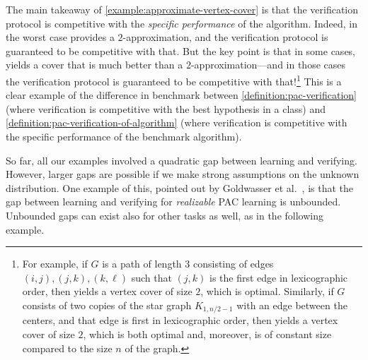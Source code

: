 \documentclass[11pt]{article}
\numberwithin{equation}{section}
\theoremstyle{definition}
\theoremstyle{plain}
\theoremstyle{definition}\newtheorem{notation}[theorem]{Notation}\theoremstyle{plain}\raggedbottom
\newcommand{\1}{\mathds{1}}
\begin{document}
The main takeaway of \cref{example:approximate-vertex-cover} is that the verification protocol is competitive with the \emph{specific performance} of the algorithm. Indeed, in the worst case  provides a {$2$-approximation}, and the verification protocol is guaranteed to be competitive with that. But the key point is that in some cases,  yields a cover that is much better than a {$2$-approximation}---and in those cases the verification protocol is guaranteed to be competitive with that!\footnote{%
	For example, if $G$ is a path of length $3$ consisting of edges $(i,j), (j,k), (k,\ell)$ such that $(j,k)$ is the first edge in lexicographic order, then  yields a vertex cover of size $2$, which is optimal. Similarly, if $G$ consists of two copies of the star graph $K_{1,n/2-1}$ with an edge between the centers, and that edge is first in lexicographic order, then  yields a vertex cover of size $2$, which is both optimal and, moreover, is of constant size compared to the size $n$ of the graph.%
} This is a clear example of the difference in benchmark between \cref{definition:pac-verification} (where verification is competitive with the best hypothesis in a class) and \cref{definition:pac-verification-of-algorithm} (where verification is competitive with the specific performance of the benchmark algorithm).

So far, all our examples involved a quadratic gap between learning and verifying. However, larger gaps are possible if we make strong assumptions on the unknown distribution. One example of this, pointed out by Goldwasser et al.\ \cite{GoldwasserRSY21}, is that the gap between learning and verifying for \emph{realizable} PAC learning is unbounded. Unbounded gaps can exist also for other tasks as well, as in the following example.
\end{document}
